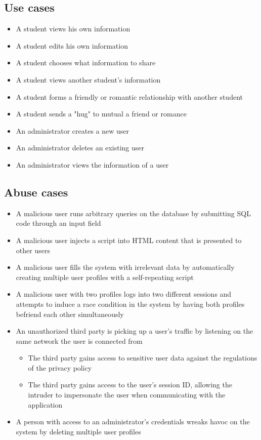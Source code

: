 \documentclass[a4paper]{article}
\begin{document}
\subsection{Use cases}
\begin{itemize}
\item A student views his own information
\item A student edits his own information
\item A student chooses what information to share
\item A student views another student’s information
\item A student forms a friendly or romantic relationship with another student
\item A student sends a "hug" to mutual a friend or romance
\item An administrator creates a new user
\item An administrator deletes an existing user
\item An administrator views the information of a user
\end{itemize}

\subsection{Abuse cases}
\begin{itemize}
\item A malicious user runs arbitrary queries on the database by submitting SQL code through an input field
\item A malicious user injects a script into HTML content that is presented to other users
\item A malicious user fills the system with irrelevant data by automatically creating multiple user profiles with a self-repeating script
\item A malicious user with two profiles logs into two different sessions and attempts to induce a race condition in the system by having both profiles befriend each other simultaneously
\item An unauthorized third party is picking up a user's traffic by listening on the same network the user is connected from
	\begin{itemize}
		\item The third party gains access to sensitive user data against the regulations of the privacy policy
		\item The third party gains access to the user's session ID, allowing the intruder to impersonate the user when communicating with the application
	\end{itemize}
\item A person with access to an administrator's credentials wreaks havoc on the system by deleting multiple user profiles
\end{itemize}
\end{document}
